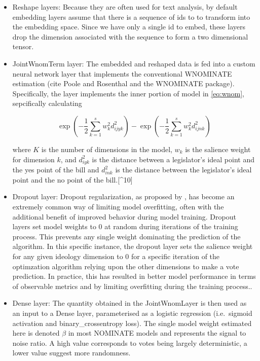 \documentclass[11pt,]{article}
\begin{document}
\begin{itemize}
\item
  Reshape layers: Because they are often used for text analysis, by
  default embedding layers assume that there is a sequence of ids to to
  transform into the embedding space. Since we have only a single id to
  embed, these layers drop the dimension associated with the sequence to
  form a two dimensional tensor.
\item
  JointWnomTerm layer: The embedded and reshaped data is fed into a
  custom neural network layer that implements the conventional WNOMINATE
  estimation (cite Poole and Rosenthal and the WNOMINATE package).
  Specifically, the layer implements the inner portion of model in
  \ref{eq:wnom}, sepcifically calculating

  \begin{equation} \label{eq:jointwnom}
  \exp\left(-\frac{1}{2}\sum_{k=1}^s w_k^2 d_{ijyk}^2 \right) - \exp\left({-\frac{1}{2}\sum_{k=1}^s w_k^2 d_{ijnk}^2 }\right)
  \end{equation}

  where \(K\) is the number of dimensions in the model, \(w_k\) is the
  salience weight for dimension \(k\), and \(d_{iyk}^2\) is the distance
  between a legislator's ideal point and the yes point of the bill and
  \(d_{ink}^2\) is the distance between the legislator's ideal point and
  the no point of the bill.{[}\^{}10{]}
\item
  Dropout layer: Dropout regularization, as proposed by \cite{dropout},
  has become an extremely common way of limiting model overfitting,
  often with the additional benefit of improved behavior during model
  training. Dropout layers set model weights to 0 at random during
  iterations of the training process. This prevents any single weight
  dominating the prediction of the algorithm. In this specific instance,
  the dropout layer sets the salience weight for any given ideology
  dimension to 0 for a specific iteration of the optimzation algorithm
  relying upon the other dimensions to make a vote prediction. In
  practice, this has resulted in better model performance in terms of
  observable metrics and by limiting overfitting during the training
  process..
\item
  Dense layer: The quantity obtained in the JointWnomLayer is then used
  as an input to a Dense layer, parameterised as a logistic regression
  (i.e.~sigmoid activation and binary\_crossentropy loss). The single
  model weight estimated here is denoted \(\beta\) in most NOMINATE
  models and represents the signal to noise ratio. A high value
  corresponds to votes being largely deterministic, a lower value
  suggest more randomness.
\end{itemize}
\end{document}
